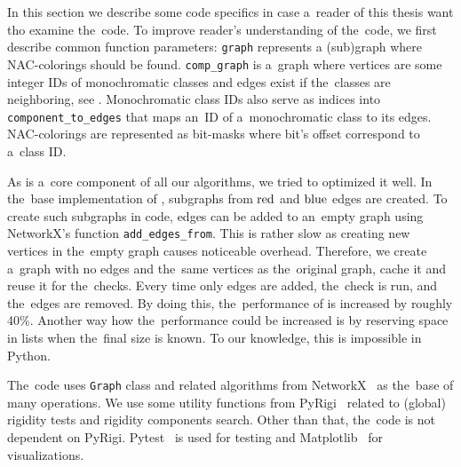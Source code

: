 In this section we describe some code specifics
in case a~reader of this thesis want tho examine the~code.
%
To improve reader's understanding of the~code,
we first describe common function parameters:
\texttt{graph} represents a (sub)graph where NAC-colorings should be found.
%
\texttt{comp\_graph} is a~graph where vertices are some integer IDs of monochromatic classes
and edges exist if the~classes are neighboring,
see .
%
Monochromatic class IDs also serve as indices into \texttt{component\_to\_edges}
that maps an~ID of a~monochromatic class to its edges.
%
NAC-colorings are represented as bit-masks where bit's offset correspond to a~class ID\@.

As \IsNACColoring{} is a~core component of all our algorithms,
we tried to optimized it well.
%
In the~base implementation of \IsNACColoring{},
subgraphs from \( \text{red} \) and \( \text{blue} \) edges are created.
To create such subgraphs in code, edges can be added to an~empty graph
using NetworkX's function \texttt{add\_edges\_from}.
%
This is rather slow as creating new vertices in the~empty graph causes noticeable overhead.
Therefore, we create a~graph with no edges and the~same vertices as the~original graph,
cache it and reuse it for the~checks.
Every time only edges are added, the~check is run, and the~edges are removed.
By doing this, the~performance of \IsNACColoring{} is increased by roughly 40\%.
%
Another way how the~performance could be increased is by reserving space in lists
when the~final size is known.
To our knowledge, this is impossible in Python.

The~code uses \texttt{Graph} class and related algorithms from NetworkX~\cite{networkx}
as the~base of many operations. We use some utility functions from PyRigi~\cite{pyrigi}
related to (global) rigidity tests and rigidity components search.
Other than that, the~code is not dependent on PyRigi.
%
Pytest~\cite{pytest} is used for testing and
Matplotlib~\cite{matplotlib} for visualizations.

